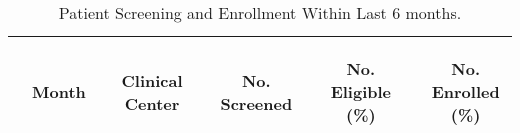 \documentclass[dvips,10pt]{article}
\begin{document}
\begin{table}[t]
\caption
{ Patient Screening and Enrollment Within Last 6 months. }
\begin{center}
\begin{tabular}{ @{}l@{}
@{}l@{}@{}p{1.5em}@{}@{}c@{}@{}p{1.5em}@{}@{}c@{}@{}p{1.5em}@{}@{}c@{}@{}p{1.5em}@{}@{}c@{}
}
\hline

& \parbox{6em}{\begin{center}Month\end{center}} && \parbox{6em}{\begin{center}Clinical Center\end{center}} && \parbox{6em}{\begin{center}No. Screened\end{center}} && \parbox{6em}{\begin{center}No. Eligible (\%)\end{center}} && \parbox{6em}{\begin{center}No. Enrolled (\%)\end{center}} \\

\hline


\end{tabular}
\end{center}
\end{table}
\end{document}
